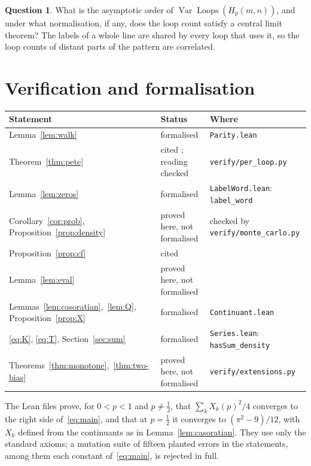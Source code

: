 \documentclass[11pt]{amsart}
\theoremstyle{definition}
\newtheorem{question}[theorem]{Question}
\theoremstyle{remark}
\newcommand{\Loops}{\operatorname{Loops}}
\begin{document}
\begin{question}
What is the asymptotic order of $\operatorname{Var}\Loops(H_p(m,n))$, and under what
normalisation, if any, does the loop count satisfy a central limit theorem? The labels of a whole line are shared by every loop that uses it, so the loop counts of
distant parts of the pattern are correlated.
\end{question}

\section{Verification and formalisation}\label{sec:checks}

\begin{table}[h]
\centering\footnotesize
\begin{tabular}{@{}p{}p{}p{}@{}}
\toprule
Statement & Status & Where\\
\midrule
Lemma~\ref{lem:walk} & formalised & \texttt{Parity.lean}\\
Theorem~\ref{thm:pete} & cited \cite{Pet08,DK24}; reading checked & \texttt{verify/per\_loop.py}\\
Lemma~\ref{lem:zeros} & formalised & \texttt{LabelWord.lean}: \texttt{label\_word}\\
Corollary~\ref{cor:prob}, Proposition~\ref{prop:density} & proved here, not formalised & checked by \texttt{verify/monte\_carlo.py}\\
Proposition~\ref{prop:cf} & cited \cite{Fla80,FS09} & \\
Lemma~\ref{lem:eval} & proved here, not formalised & \\
Lemmas~\ref{lem:casoratian},~\ref{lem:Q}, Proposition~\ref{prop:X} & formalised & \texttt{Continuant.lean}\\
\eqref{eq:K}, \eqref{eq:T}, Section~\ref{sec:sum} & formalised & \texttt{Series.lean}: \texttt{hasSum\_density}\\
Theorems~\ref{thm:monotone},~\ref{thm:two-bias} & proved here, not formalised & \texttt{verify/extensions.py}\\
\bottomrule
\end{tabular}
\end{table}

The Lean files prove, for $0<p<1$ and $p\ne\tfrac12$, that $\sum_k X_k(p)^2/4$ converges to the right
side of~\eqref{eq:main}, and that at $p=\tfrac12$ it converges to $(\pi^2-9)/12$, with $X_k$ defined
from the continuants as in Lemma~\ref{lem:casoratian}. They use only the standard axioms; a mutation
suite of fifteen planted errors in the statements, among them each constant of~\eqref{eq:main}, is
rejected in full.
\end{document}
